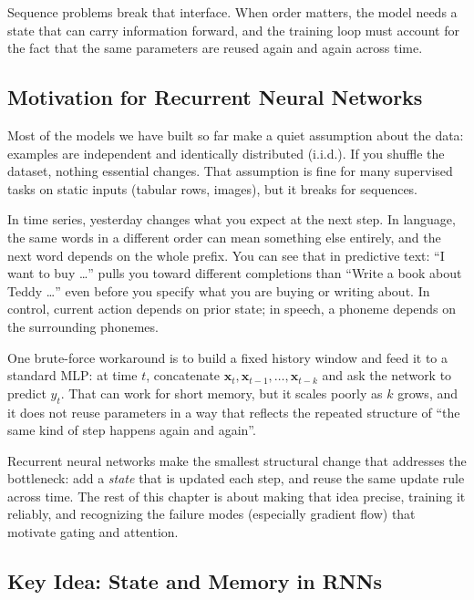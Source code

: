 Sequence problems break that interface. When order matters, the model needs a state that can carry information forward, and the training loop must account for the fact that the same parameters are reused again and again across time.

\subsection{Motivation for Recurrent Neural Networks}
\label{sec:rnn_motivation_for_recurrent_neural_networks}

Most of the models we have built so far make a quiet assumption about the data: examples are independent and identically distributed (i.i.d.). If you shuffle the dataset, nothing essential changes. That assumption is fine for many supervised tasks on static inputs (tabular rows, images), but it breaks for sequences.

In time series, yesterday changes what you expect at the next step. In language, the same words in a different order can mean something else entirely, and the next word depends on the whole prefix. You can see that in predictive text: ``I want to buy \ldots'' pulls you toward different completions than ``Write a book about Teddy \ldots'' even before you specify what you are buying or writing about. In control, current action depends on prior state; in speech, a phoneme depends on the surrounding phonemes.

One brute-force workaround is to build a fixed history window and feed it to a standard MLP: at time \(t\), concatenate \(\mathbf{x}_t,\mathbf{x}_{t-1},\ldots,\mathbf{x}_{t-k}\) and ask the network to predict \(y_t\). That can work for short memory, but it scales poorly as \(k\) grows, and it does not reuse parameters in a way that reflects the repeated structure of ``the same kind of step happens again and again''.

Recurrent neural networks make the smallest structural change that addresses the bottleneck: add a \emph{state} that is updated each step, and reuse the same update rule across time. The rest of this chapter is about making that idea precise, training it reliably, and recognizing the failure modes (especially gradient flow) that motivate gating and attention.

\subsection{Key Idea: State and Memory in RNNs}
\label{sec:rnn_key_idea_state_and_memory_in_rnns}

